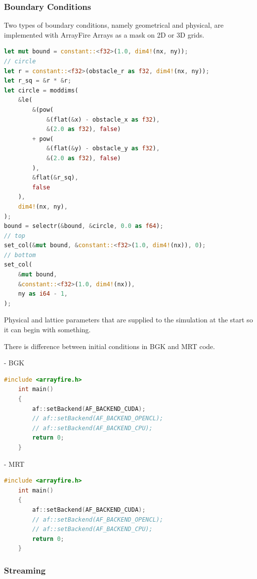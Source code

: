 \subsubsection{Boundary Conditions}

Two types of boundary conditions, namely geometrical and physical, are implemented with ArrayFire Arrays as a mask on 2D or 3D grids. 

\begin{lstlisting}[language=Rust, caption=Setting the geometrical boundary conditions of circle in a pipe flow (2D Karmán vortex)., label=init-circle]
let mut bound = constant::<f32>(1.0, dim4!(nx, ny));
// circle
let r = constant::<f32>(obstacle_r as f32, dim4!(nx, ny));
let r_sq = &r * &r;
let circle = moddims(
	&le(
		&(pow(
			&(flat(&x) - obstacle_x as f32),
			&(2.0 as f32), false)
		+ pow(
			&(flat(&y) - obstacle_y as f32),
			&(2.0 as f32), false)
		),
		&flat(&r_sq),
		false
	),
	dim4!(nx, ny),
);
bound = selectr(&bound, &circle, 0.0 as f64);
// top
set_col(&mut bound, &constant::<f32>(1.0, dim4!(nx)), 0);
// bottom
set_col(
	&mut bound,
	&constant::<f32>(1.0, dim4!(nx)),
	ny as i64 - 1,
);
\end{lstlisting}


Physical and lattice parameters that are supplied to the simulation at the start so it can begin with something.

There is difference between initial conditions in BGK and MRT code.

- BGK \\

\begin{lstlisting}[language=Cpp, caption=C++ code for setting different computing backends., label=cpp-backends]
	#include <arrayfire.h>
	int main()
	{
		af::setBackend(AF_BACKEND_CUDA);
		// af::setBackend(AF_BACKEND_OPENCL);
		// af::setBackend(AF_BACKEND_CPU);
		return 0;
	}
\end{lstlisting}

- MRT \\

\begin{lstlisting}[language=Cpp, caption=C++ code for setting different computing backends., label=cpp-backends]
	#include <arrayfire.h>
	int main()
	{
		af::setBackend(AF_BACKEND_CUDA);
		// af::setBackend(AF_BACKEND_OPENCL);
		// af::setBackend(AF_BACKEND_CPU);
		return 0;
	}
\end{lstlisting}

\subsubsection{Streaming}

